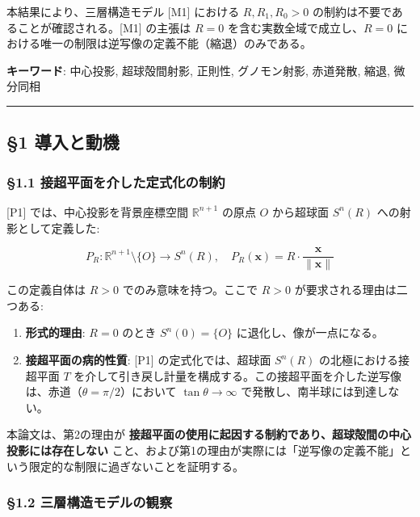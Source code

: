 \documentclass[
  a4paper]{ltjsarticle}
\providecommand{\tightlist}{%
  \setlength{\itemsep}{0pt}\setlength{\parskip}{0pt}}
\begin{document}
本結果により、三層構造モデル {[}M1{]} における \(R, R_1, R_0 > 0\)
の制約は不要であることが確認される。{[}M1{]} の主張は \(R = 0\)
を含む実数全域で成立し、\(R = 0\)
における唯一の制限は逆写像の定義不能（縮退）のみである。

\textbf{キーワード}: 中心投影, 超球殻間射影, 正則性, グノモン射影,
赤道発散, 縮退, 微分同相

\begin{center}\rule{0.5\linewidth}{0.5pt}\end{center}

\subsection{§1 導入と動機}\label{ux5c0eux5165ux3068ux52d5ux6a5f}

\subsubsection{§1.1
接超平面を介した定式化の制約}\label{ux63a5ux8d85ux5e73ux9762ux3092ux4ecbux3057ux305fux5b9aux5f0fux5316ux306eux5236ux7d04}

{[}P1{]} では、中心投影を背景座標空間 \(\mathbb{R}^{n+1}\) の原点 \(O\)
から超球面 \(S^n(R)\) への射影として定義した:

\[
P_R : \mathbb{R}^{n+1} \setminus \{O\} \to S^n(R), \quad P_R(\mathbf{x}) = R \cdot \frac{\mathbf{x}}{\|\mathbf{x}\|}
\]

この定義自体は \(R > 0\) でのみ意味を持つ。ここで \(R > 0\)
が要求される理由は二つある:

\begin{enumerate}
\def\labelenumi{\arabic{enumi}.}
\tightlist
\item
  \textbf{形式的理由}: \(R = 0\) のとき \(S^n(0) = \{O\}\)
  に退化し、像が一点になる。
\item
  \textbf{接超平面の病的性質}: {[}P1{]} の定式化では、超球面 \(S^n(R)\)
  の北極における接超平面 \(T\)
  を介して引き戻し計量を構成する。この接超平面を介した逆写像は、赤道（\(\theta = \pi/2\)）において
  \(\tan\theta \to \infty\) で発散し、南半球には到達しない。
\end{enumerate}

本論文は、第2の理由が
\textbf{接超平面の使用に起因する制約であり、超球殻間の中心投影には存在しない}
こと、および第1の理由が実際には「逆写像の定義不能」という限定的な制限に過ぎないことを証明する。

\subsubsection{§1.2
三層構造モデルの観察}\label{ux4e09ux5c64ux69cbux9020ux30e2ux30c7ux30ebux306eux89b3ux5bdf}
\end{document}

